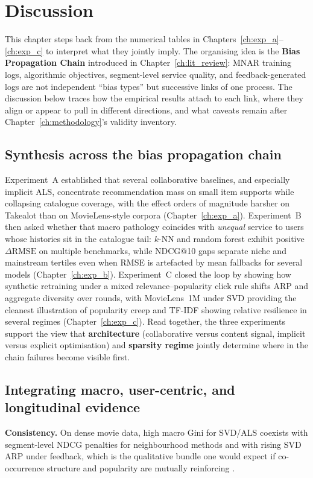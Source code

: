 \chapter{Discussion}
\label{ch:discussion}

This chapter steps back from the numerical tables in Chapters~\ref{ch:exp_a}--\ref{ch:exp_c} to interpret what they jointly imply. The organising idea is the \textbf{Bias Propagation Chain} introduced in Chapter~\ref{ch:lit_review}: MNAR training logs, algorithmic objectives, segment-level service quality, and feedback-generated logs are not independent ``bias types'' but successive links of one process. The discussion below traces how the empirical results attach to each link, where they align or appear to pull in different directions, and what caveats remain after Chapter~\ref{ch:methodology}'s validity inventory.

\section{Synthesis across the bias propagation chain}
Experiment~A established that several collaborative baselines, and especially implicit ALS, concentrate recommendation mass on small item supports while collapsing catalogue coverage, with the effect orders of magnitude harsher on Takealot than on MovieLens-style corpora (Chapter~\ref{ch:exp_a}). Experiment~B then asked whether that macro pathology coincides with \emph{unequal} service to users whose histories sit in the catalogue tail: $k$-NN and random forest exhibit positive $\Delta\mathrm{RMSE}$ on multiple benchmarks, while NDCG@10 gaps separate niche and mainstream tertiles even when RMSE is artefacted by mean fallbacks for several models (Chapter~\ref{ch:exp_b}). Experiment~C closed the loop by showing how synthetic retraining under a mixed relevance--popularity click rule shifts ARP and aggregate diversity over rounds, with MovieLens~1M under SVD providing the cleanest illustration of popularity creep and TF-IDF showing relative resilience in several regimes (Chapter~\ref{ch:exp_c}). Read together, the three experiments support the view that \textbf{architecture} (collaborative versus content signal, implicit versus explicit optimisation) and \textbf{sparsity regime} jointly determine where in the chain failures become visible first.

\section{Integrating macro, user-centric, and longitudinal evidence}
\textbf{Consistency.} On dense movie data, high macro Gini for SVD/ALS coexists with segment-level NDCG penalties for neighbourhood methods and with rising SVD ARP under feedback, which is the qualitative bundle one would expect if co-occurrence structure and popularity are mutually reinforcing \citep{abdollahpouri2019managing, mansoury2020feedback}.

